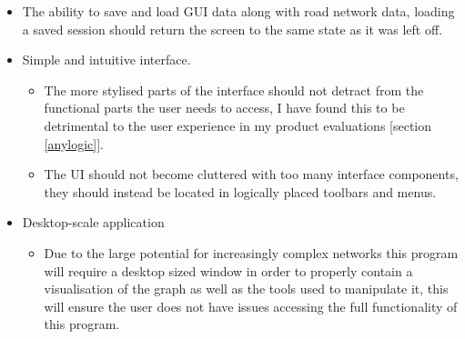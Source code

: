    \begin{itemize}
        \item The ability to save and load GUI data along with road network data, loading a saved session should return the screen to the same state as it was left off.
        \item Simple and intuitive interface.
        \begin{itemize}
            \item The more stylised parts of the interface should not detract from the functional parts the user needs to access, I have found this to be detrimental to the user experience in my product evaluations [section \ref{anylogic}].
            \item The UI should not become cluttered with too many interface components, they should instead be located in logically placed toolbars and menus.
        \end{itemize}
        \item Desktop-scale application
        \begin{itemize}
            \item Due to the large potential for increasingly complex networks this program will require a desktop sized window in order to properly contain a visualisation of the graph as well as the tools used to manipulate it, this will ensure the user does not have issues accessing the full functionality of this program.
        \end{itemize}
    \end{itemize}
